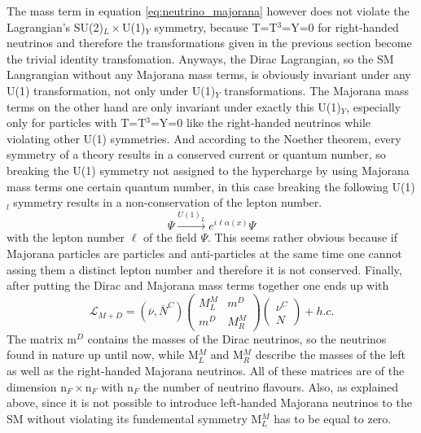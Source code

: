 The mass term in equation \ref{eq:neutrino_majorana} however does not violate the Lagrangian's SU(2)$_L\times$U(1)$_Y$ symmetry, because T=T$^3$=Y=0 for right-handed neutrinos and therefore the transformations given in the previous section become the trivial identity transfomation. Anyways, the Dirac Lagrangian, so the SM Langrangian without any Majorana mass terms, is obviously invariant under any U(1) transformation, not only under U(1)$_Y$ transformations. The Majorana mass terms on the other hand are only invariant under exactly this U(1)$_Y$, especially only for particles with T=T$^3$=Y=0 like the right-handed neutrinos while violating other U(1) symmetries. And according to the Noether theorem, every symmetry of a theory results in a conserved current or quantum number, so breaking the U(1) symmetry not assigned to the hypercharge by using Majorana mass terms one certain quantum number, in this case breaking the following U(1)$_l$ symmetry results in a non-conservation of the lepton number.
\begin{equation}
	\Psi\overset{U(1)_L}{\longrightarrow}e^{i\ell\alpha(x)}\Psi
\end{equation}
with the lepton number $\ell$ of the field $\Psi$.
This seems rather obvious because if Majorana particles are particles and anti-particles at the same time one cannot assing them a distinct lepton number and therefore it is not conserved. \newline
Finally, after putting the Dirac and Majorana mass terms together one ends up with
\begin{equation}
	\mathcal{L}_{M+D}=\left(\overline{\nu},\overline{N}^C\right)	\left(\begin{array}{cc}M^M_L&m^D\\m^D&M^M_R\end{array}\right)	\left(\begin{array}{c}\nu^C\\N\end{array}\right)+h.c.
	\label{eq_majorana_dirac}
\end{equation}
The matrix m$^D$ contains the masses of the Dirac neutrinos, so the neutrinos found in nature up until now, while M$^M_L$ and M$^M_R$ describe the masses of the left as well as the right-handed Majorana neutrinos. All of these matrices are of the dimension n$_F\times$n$_F$ with n$_F$ the number of neutrino flavours. Also, as explained above, since it is not possible to introduce left-handed Majorana neutrinos to the SM without violating its fundemental symmetry M$^M_L$ has to be equal to zero.
